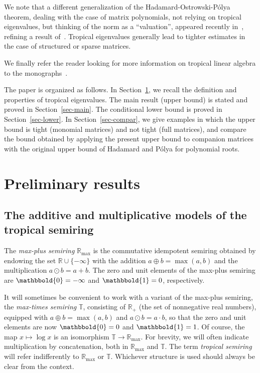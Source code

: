 \documentclass[a4paper]{amsart}
\theoremstyle{definition}
\theoremstyle{plain}
\theoremstyle{remark}
\begin{document}
We note that a different generalization of the Hadamard-Ostrowski-P\'olya theorem, dealing with the case of matrix polynomials, not relying on tropical eigenvalues, but thinking of the norm
as a ``valuation'', appeared recently in~\cite{ostags13}, refining
a result of~\cite{POSTA09}. Tropical eigenvalues generally
lead to tighter estimates in the case of structured or sparse matrices.

We finally refer the reader looking for more information on tropical linear algebra
to the monographs~\cite{baccelli,butkovic2010max}.

The paper is organized as follows. In Section~\ref{sec-prelim}, we recall
the definition and properties of tropical eigenvalues. The main result
(upper bound) is stated and proved in Section~\ref{sec-main}. 
The conditional lower bound is proved in Section~\ref{sec-lower}.
In Section~\ref{sec-compar}, we give examples in which the upper bound
is tight (monomial matrices) and not tight (full matrices), 
and compare the bound obtained by applying the present upper bound
to companion matrices with the original upper bound of Hadamard and P\'olya
for polynomial roots.

\section{Preliminary results}\label{sec-prelim}
\subsection{The additive and multiplicative models of the tropical semiring}
The \emph{max-plus semiring} ${{\mathbb{R}_{\max}}}$ is the commutative idempotent semiring
obtained by endowing the set $\mathbb {R}\cup\{-\infty\}$ with the
addition 
\(
a \oplus b = \max (a,b)\)
and the multiplication
\(
 a \odot b = a + b
\).
The zero and unit elements of the max-plus semiring are ${\mathbbold{0}}=-\infty$ and ${\mathbbold{1}} = 0$, respectively.

It will sometimes be convenient to work with a
variant of the max-plus semiring, the
\emph{max-times semiring} ${{\mathbb{T}}}$,
consisting of ${\mathbb{R}}_+$ (the set of nonnegative real numbers),
equipped with 
\(
a \oplus b = \max (a,b)\)
and \(
a \odot b = a \cdot b 
\),
so that the zero and unit elements are now 
${\mathbbold{0}}=0$
and ${\mathbbold{1}} = 1$. Of course, the map $x\mapsto \log x$ is an
isomorphism ${{\mathbb{T}}} \to {{\mathbb{R}_{\max}}}$.
For brevity, we will often indicate
multiplication by concatenation, both
in ${{\mathbb{R}_{\max}}}$ and ${{\mathbb{T}}}$. The term {\em tropical
semiring} will refer indifferently to
${{\mathbb{R}_{\max}}}$ or ${{\mathbb{T}}}$. Whichever
structure is used should always be clear from
the context.
\end{document}
